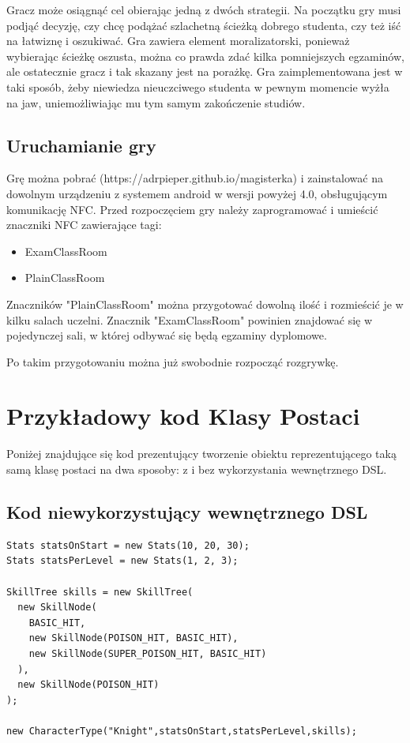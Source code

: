 \documentclass[openright]{xmgr}
\begin{document}
Gracz może osiągnąć cel obierając jedną z dwóch strategii. Na początku gry musi podjąć decyzję, czy chcę podążać szlachetną ścieżką dobrego studenta, czy też iść na łatwiznę i oszukiwać. Gra zawiera element moralizatorski, ponieważ wybierając ścieżkę oszusta, można co prawda zdać kilka pomniejszych egzaminów, ale ostatecznie gracz i tak skazany jest na porażkę. Gra zaimplementowana jest w taki sposób, żeby niewiedza nieuczciwego studenta w pewnym momencie wyżła na jaw, uniemożliwiając mu tym samym zakończenie studiów.

\section{Uruchamianie gry}

Grę można pobrać (https://adrpieper.github.io/magisterka) i zainstalować na dowolnym urządzeniu z systemem android w wersji powyżej 4.0, obsługującym komunikację NFC. Przed rozpoczęciem gry należy zaprogramować i umieścić znaczniki NFC zawierające tagi:
\begin{itemize}
	\item ExamClassRoom
	\item PlainClassRoom
\end{itemize}
Znaczników "PlainClassRoom" można przygotować dowolną ilość i rozmieścić je w kilku salach uczelni. Znacznik "ExamClassRoom" powinien znajdować się w pojedynczej sali, w której odbywać się będą egzaminy dyplomowe.

Po takim przygotowaniu można już swobodnie rozpocząć rozgrywkę.

\appendix

\chapter{Przykładowy kod Klasy Postaci}
Poniżej znajdujące się kod prezentujący tworzenie obiektu reprezentującego taką samą klasę postaci na dwa sposoby: z i bez wykorzystania wewnętrznego DSL.
\section*{Kod niewykorzystujący wewnętrznego DSL}
\begin{verbatim}
Stats statsOnStart = new Stats(10, 20, 30);
Stats statsPerLevel = new Stats(1, 2, 3);

SkillTree skills = new SkillTree(
  new SkillNode(
    BASIC_HIT,
    new SkillNode(POISON_HIT, BASIC_HIT),
    new SkillNode(SUPER_POISON_HIT, BASIC_HIT)
  ),
  new SkillNode(POISON_HIT)
);

new CharacterType("Knight",statsOnStart,statsPerLevel,skills);
\end{verbatim}
\end{document}
